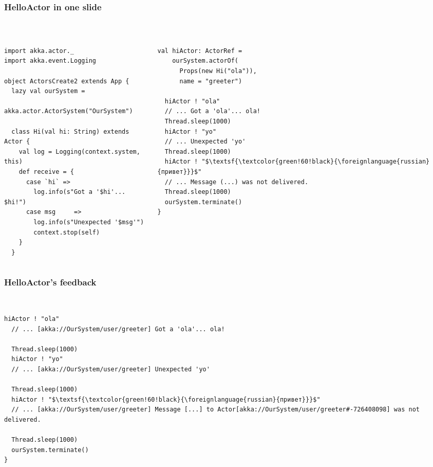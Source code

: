 \documentclass[aspectratio=169]{beamer}
\begin{document}
\begin{frame}[fragile]\frametitle{HelloActor in one slide}
~\\[-6mm]
\begin{columns}
\begin{column}{0.58\textwidth}
\begin{lstlisting}[emph={Actor, Logging, Props, receive, stop, log, terminate, actorOf}]
import akka.actor._
import akka.event.Logging

object ActorsCreate2 extends App {
  lazy val ourSystem =
    akka.actor.ActorSystem("OurSystem")

  class Hi(val hi: String) extends Actor {
    val log = Logging(context.system, this)
    def receive = {
      case `hi` =>
        log.info(s"Got a '$hi'... $hi!")
      case msg     =>
        log.info(s"Unexpected '$msg'")
        context.stop(self)
    }
  }
\end{lstlisting}
\end{column}
\begin{column}{0.42\textwidth}
\begin{lstlisting}[emph={Actor, Logging, Props, receive, stop, log, terminate, actorOf},mathescape=true]
  val hiActor: ActorRef =
    ourSystem.actorOf(
      Props(new Hi("ola")),
      name = "greeter")

  hiActor ! "ola"
  // ... Got a 'ola'... ola!
  Thread.sleep(1000)
  hiActor ! "yo"
  // ... Unexpected 'yo'
  Thread.sleep(1000)
  hiActor ! "$\textsf{\textcolor{green!60!black}{\foreignlanguage{russian}{привет}}}$" 
  // ... Message (...) was not delivered.
  Thread.sleep(1000)
  ourSystem.terminate()
}
\end{lstlisting}
\end{column}
\end{columns}
\end{frame}

\begin{frame}[fragile]\frametitle{HelloActor's feedback}
~\\[-6mm]
\begin{lstlisting}[emph={Actor, Logging, Props, receive, stop, log, terminate, actorOf},mathescape=true]
  hiActor ! "ola"
  // ... [akka://OurSystem/user/greeter] Got a 'ola'... ola!

  Thread.sleep(1000)
  hiActor ! "yo"
  // ... [akka://OurSystem/user/greeter] Unexpected 'yo'

  Thread.sleep(1000)
  hiActor ! "$\textsf{\textcolor{green!60!black}{\foreignlanguage{russian}{привет}}}$" 
  // ... [akka://OurSystem/user/greeter] Message [...] to Actor[akka://OurSystem/user/greeter#-726408098] was not delivered.

  Thread.sleep(1000)
  ourSystem.terminate()
}
\end{lstlisting}
\end{frame}
\end{document}
